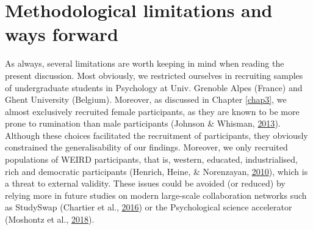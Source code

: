 \documentclass[a4paper,12pt,twoside,onecolumn,openright,final,oldfontcommands]{memoir}
\begin{document}
\hypertarget{methodological-limitations-and-ways-forward}{%
\section{Methodological limitations and ways forward}\label{methodological-limitations-and-ways-forward}}

As always, several limitations are worth keeping in mind when reading the present discussion. Most obviously, we restricted ourselves in recruiting samples of undergraduate students in Psychology at Univ. Grenoble Alpes (France) and Ghent University (Belgium). Moreover, as discussed in Chapter \ref{chap3}, we almost exclusively recruited female participants, as they are known to be more prone to rumination than male participants (Johnson \& Whisman, \protect\hyperlink{ref-Johnson2013}{2013}). Although these choices facilitated the recruitment of participants, they obviously constrained the generalisability of our findings. Moreover, we only recruited populations of WEIRD participants, that is, western, educated, industrialised, rich and democratic participants (Henrich, Heine, \& Norenzayan, \protect\hyperlink{ref-henrich_weirdest_2010}{2010}), which is a threat to external validity. These issues could be avoided (or reduced) by relying more in future studies on modern large-scale collaboration networks such as StudySwap (Chartier et al., \protect\hyperlink{ref-chartier_studyswap_2016}{2016}) or the Psychological science accelerator (Moshontz et al., \protect\hyperlink{ref-moshontz_psychological_2018}{2018}).
\end{document}
